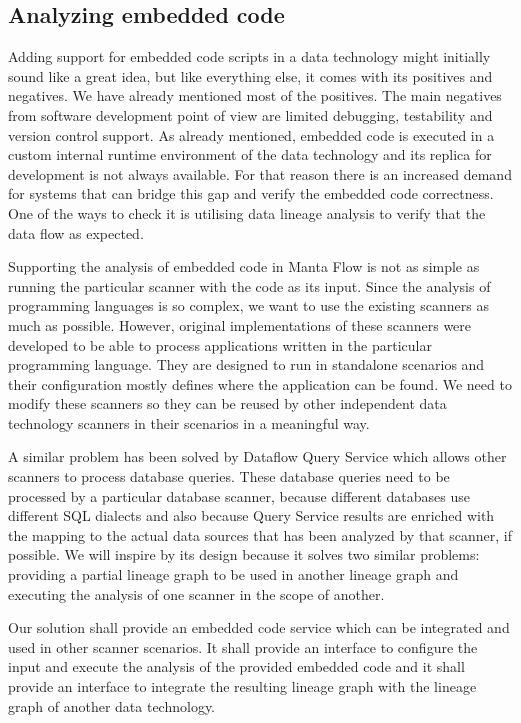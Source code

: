 \subsection{Analyzing embedded code}
Adding support for embedded code scripts in a data technology might initially sound like a great idea, but like everything else, it comes with its positives and negatives. We have already mentioned most of the positives. The main negatives from software development point of view are limited debugging, testability and version control support. As already mentioned, embedded code is executed in a custom internal runtime environment of the data technology and its replica for development is not always available. For that reason there is an increased demand for systems that can bridge this gap and verify the embedded code correctness. One of the ways to check it is utilising data lineage analysis to verify that the data flow as expected.
\par %
Supporting the analysis of embedded code in Manta Flow is not as simple as running the particular scanner with the code as its input. Since the analysis of programming languages is so complex, we want to use the existing scanners as much as possible. However, original implementations of these scanners were developed to be able to process applications written in the particular programming language. They are designed to run in standalone scenarios and their configuration mostly defines where the application can be found. We need to modify these scanners so they can be reused by other independent data technology scanners in their scenarios in a meaningful way.
\par %
A similar problem has been solved by Dataflow Query Service which allows other scanners to process database queries. These database queries need to be processed by a particular database scanner, because different databases use different SQL dialects and also because Query Service results are enriched with the mapping to the actual data sources that has been analyzed by that scanner, if possible. We will inspire by its design because it solves two similar problems: providing a partial lineage graph to be used in another lineage graph and executing the analysis of one scanner in the scope of another.
\par %
Our solution shall provide an embedded code service which can be integrated and used in other scanner scenarios. It shall provide an interface to configure the input and execute the analysis of the provided embedded code and it shall provide an interface to integrate the resulting lineage graph with the lineage graph of another data technology.

